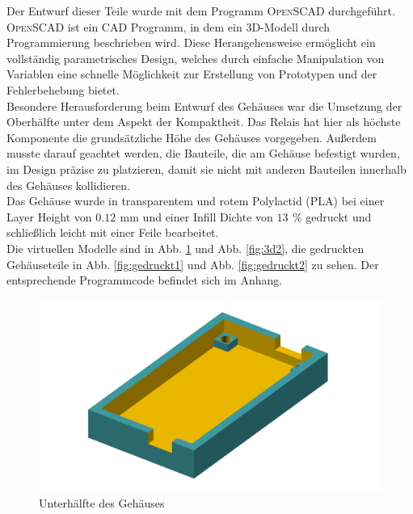 \documentclass[a4paper, 12pt]{article}
\begin{document}
      Der Entwurf dieser Teile wurde mit dem Programm \textsc{OpenSCAD} durchgeführt. \textsc{OpenSCAD} ist ein CAD Programm, in dem ein 3D-Modell durch Programmierung beschrieben wird. Diese Herangehensweise ermöglicht ein vollständig parametrisches Design, welches durch einfache Manipulation von Variablen eine schnelle Möglichkeit zur Erstellung von Prototypen und der Fehlerbehebung bietet. \\

      Besondere Herausforderung beim Entwurf des Gehäuses war die Umsetzung der Oberhälfte unter dem Aspekt der Kompaktheit. Das Relais hat hier als höchste Komponente die grundsätzliche Höhe des Gehäuses vorgegeben. Außerdem musste darauf geachtet werden, die Bauteile, die am Gehäuse befestigt wurden, im Design präzise zu platzieren, damit sie nicht mit anderen Bauteilen innerhalb des Gehäuses kollidieren. \\

      Das Gehäuse wurde in transparentem und rotem Polylactid (PLA) bei einer Layer Height von $0.12 \,\ \si{\milli\meter}$ und einer Infill Dichte von $13 \,\ \%$ gedruckt und schließlich leicht mit einer Feile bearbeitet.\\

      Die virtuellen Modelle sind in Abb. \ref{fig:3d1} und Abb. \ref{fig:3d2}, die gedruckten Gehäuseteile in Abb. \ref{fig:gedruckt1} und Abb. \ref{fig:gedruckt2} zu sehen. Der entsprechende Programmcode befindet sich im Anhang.

      \begin{center}
        \begin{figure}[H]
        \includegraphics[page=1, scale=0.5]{graphics/Gehaeuse_bottom.png}
        \caption{Unterhälfte des Gehäuses}
        \label{fig:3d1}
        \end{figure}
      \end{center}
\end{document}
